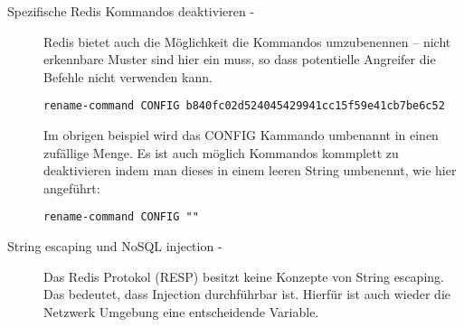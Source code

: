 \begin{description}
\item[Spezifische Redis Kommandos deaktivieren - \newline]
Redis bietet auch die Möglichkeit die Kommandos umzubenennen – nicht erkennbare Muster sind hier ein muss, so dass potentielle Angreifer die Befehle nicht verwenden kann.

\lstinline{rename-command CONFIG b840fc02d524045429941cc15f59e41cb7be6c52}

Im obrigen beispiel wird das CONFIG Kammando umbenannt in einen zufällige Menge. Es ist auch möglich Kommandos kommplett zu deaktivieren indem man dieses in einem leeren String umbenennt, wie hier angeführt:

\lstinline{rename-command CONFIG ""}

\item[String escaping und NoSQL injection - \newline]
Das Redis Protokol (RESP) besitzt keine Konzepte von String escaping\cite{MELD.CH3-redis.mainWebsite}. Das bedeutet, dass Injection durchführbar ist. Hierfür ist auch wieder die Netzwerk Umgebung eine entscheidende Variable.
\end{description}